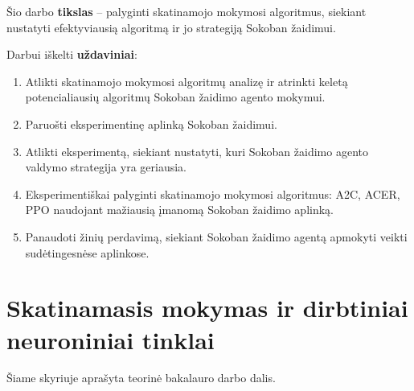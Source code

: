 \documentclass{VUMIFPSbakalaurinis}
\begin{document}
\label{subsec:tikslas}
{
	Šio darbo \textbf{tikslas} -- palyginti skatinamojo mokymosi algoritmus, siekiant nustatyti efektyviausią algoritmą ir jo strategiją Sokoban žaidimui.
}
\label{subsec:uzdaviniai}
{
	Darbui iškelti \textbf{uždaviniai}:
	\begin{enumerate}
		\item Atlikti skatinamojo mokymosi algoritmų analizę ir atrinkti keletą potencialiausių algoritmų Sokoban žaidimo agento mokymui.
		\item Paruošti eksperimentinę aplinką Sokoban žaidimui.
		\item Atlikti eksperimentą, siekiant nustatyti, kuri Sokoban žaidimo agento valdymo strategija yra geriausia.
		\item Eksperimentiškai palyginti skatinamojo mokymosi algoritmus: A2C, ACER, PPO naudojant mažiausią įmanomą Sokoban žaidimo aplinką.
		\item Panaudoti žinių perdavimą, siekiant Sokoban žaidimo agentą apmokyti veikti sudėtingesnėse aplinkose.
	\end{enumerate}
}
\section{Skatinamasis mokymas ir dirbtiniai neuroniniai tinklai}\label{sec:1}
Šiame skyriuje aprašyta teorinė bakalauro darbo dalis.
\end{document}
